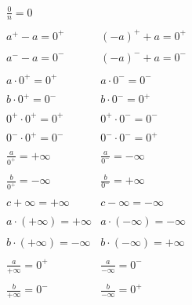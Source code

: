 \documentclass[a4paper,14pt]{extarticle}
\begin{document}
\large
\[
\begin{array}{cc}
\frac{0}{n} = 0 \\ & \\
a^+ - a = 0^+ & (-a)^+ + a = 0^+ \\ & \\
a^- - a = 0^- & (-a)^- + a = 0^- \\ & \\
a \cdot 0^+ = 0^+ & a \cdot 0^- = 0^-\\ & \\
b \cdot 0^+ = 0^- & b \cdot 0^- = 0^+\\ & \\
0^+ \cdot 0^+ = 0^+ & 0^+ \cdot 0^- = 0^- \\ & \\
0^- \cdot 0^+ = 0^- & 0^- \cdot 0^- = 0^+ \\ & \\
\frac{a}{0^+} = + \infty & \frac{a}{0^-} = - \infty \\ & \\
\frac{b}{0^+} = - \infty & \frac{b}{0^-} = + \infty \\ & \\
c + \infty = +\infty & c - \infty = -\infty \\ & \\
a \cdot (+\infty) = +\infty & a \cdot (-\infty) = -\infty \\ & \\
b \cdot (+\infty) = -\infty & b \cdot (-\infty) = +\infty \\ & \\
\frac{a}{+\infty} = 0^+ & \frac{a}{-\infty} = 0^-\\ & \\
\frac{b}{+\infty} = 0^- & \frac{b}{-\infty} = 0^+\\ & \\
\end{array}
\]
\end{document}
